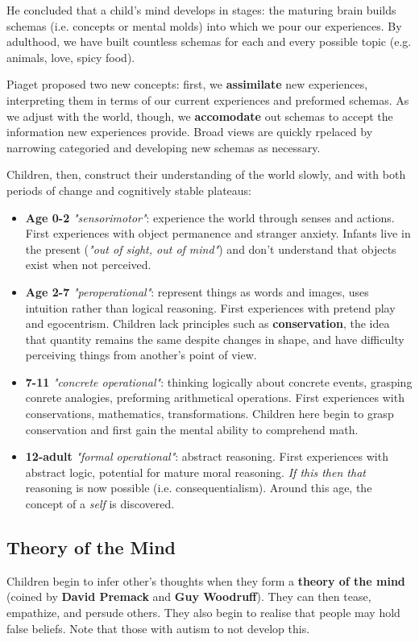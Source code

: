\documentclass[12pt]{article}
\begin{document}
He concluded that a child's mind develops in stages: the maturing brain builds schemas (i.e. concepts or mental molds) into which we pour our experiences. By adulthood, we have built countless schemas for each and every possible topic (e.g. animals, love, spicy food).

Piaget proposed two new concepts: first, we {\bf assimilate} new experiences, interpreting them in terms of our current experiences and preformed schemas. As we adjust with the world, though, we {\bf accomodate} out schemas to accept the information new experiences provide. Broad views are quickly rpelaced by narrowing categoried and developing new schemas as necessary.

Children, then, construct their understanding of the world slowly, and with both periods of change and cognitively stable plateaus:

\begin{itemize}
\item {\bf Age 0-2} {\it "sensorimotor"}: experience the world through senses and actions. First experiences with object permanence and stranger anxiety. Infants live in the present ({\it "out of sight, out of mind"}) and don't understand that objects exist when not perceived.
\item {\bf Age 2-7} {\it "peroperational"}: represent things as words and images, uses intuition rather than logical reasoning. First experiences with pretend play and egocentrism. Children lack principles such as {\bf conservation}, the idea that quantity remains the same despite changes in shape, and have difficulty perceiving things from another's point of view.
\item {\bf 7-11} {\it "concrete operational"}: thinking logically about concrete events, grasping conrete analogies, preforming arithmetical operations. First experiences with conservations, mathematics, transformations. Children here begin to grasp conservation and first gain the mental ability to comprehend math.
\item {\bf 12-adult} {\it "formal operational"}: abstract reasoning. First experiences with abstract logic, potential for mature moral reasoning. {\it If this then that} reasoning is now possible (i.e. consequentialism). Around this age, the concept of a {\it self} is discovered.
\end{itemize}

\subsection*{Theory of the Mind}
Children begin to infer other's thoughts when they form a {\bf theory of the mind} (coined by {\bf David Premack} and {\bf Guy Woodruff}). They can then tease, empathize, and persude others. They also begin to realise that people may hold false beliefs. Note that those with autism to not develop this.
\end{document}

